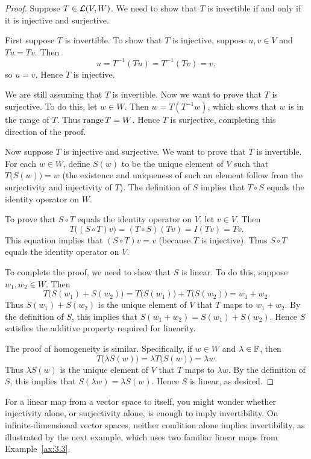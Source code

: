 \begin{proof}
Suppose $T\in\mathcal{L}(V,W)$. We need to show that $T$ is invertible if and only if
it is injective and surjective.

First suppose $T$ is invertible. To show that $T$ is injective, suppose
$u,v\in V$ and $Tu=Tv$. Then
\[ u = T^{-1}(Tu) = T^{-1}(Tv) = v, \]
so $u=v$. Hence $T$ is injective.

We are still assuming that $T$ is invertible. Now we want to prove that $T$ is
surjective. To do this, let $w\in W$. Then $w=T(T^{-1}w)$, which shows that $w$
is in the range of $T$. Thus $\operatorname{range} T=W$. Hence $T$ is surjective, completing
this direction of the proof.

Now suppose $T$ is injective and surjective. We want to prove that $T$ is
invertible. For each $w\in W$, define $S(w)$ to be the unique element of $V$
such that $T\bigl(S(w)\bigr)=w$ (the existence and uniqueness of such an
element follow from the surjectivity and injectivity of $T$). The definition of
$S$ implies that $T\circ S$ equals the identity operator on $W$.

To prove that $S\circ T$ equals the identity operator on $V$, let $v\in V$.
Then
\[ T\bigl((S\circ T)v\bigr) = (T\circ S)(Tv) = I(Tv) = Tv. \]
This equation implies that $(S\circ T)v=v$ (because $T$ is injective). Thus
$S\circ T$ equals the identity operator on $V$.

To complete the proof, we need to show that $S$ is linear. To do this, suppose
$w_1,w_2\in W$. Then
\[ T\bigl(S(w_1)+S(w_2)\bigr) = T\bigl(S(w_1)\bigr)+T\bigl(S(w_2)\bigr)
   = w_1+w_2. \]
Thus $S(w_1)+S(w_2)$ is the unique element of $V$ that $T$ maps to $w_1+w_2$.
By the definition of $S$, this implies that $S(w_1+w_2)=S(w_1)+S(w_2)$. Hence
$S$ satisfies the additive property required for linearity.

The proof of homogeneity is similar. Specifically, if $w\in W$ and
$\lambda\in\mathbb{F}$, then
\[ T\bigl(\lambda S(w)\bigr) = \lambda T\bigl(S(w)\bigr) = \lambda w. \]
Thus $\lambda S(w)$ is the unique element of $V$ that $T$ maps to $\lambda w$.
By the definition of $S$, this implies that $S(\lambda w)=\lambda S(w)$. Hence
$S$ is linear, as desired.
\end{proof}

For a linear map from a vector space to itself, you might wonder whether
injectivity alone, or surjectivity alone, is enough to imply invertibility. On
infinite-dimensional vector spaces, neither condition alone implies
invertibility, as illustrated by the next example, which uses two familiar
linear maps from Example~\ref{ax:3.3}.

